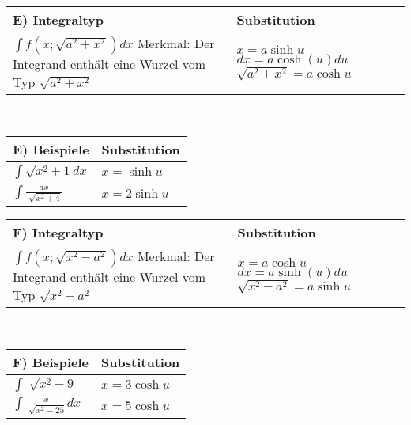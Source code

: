 \documentclass[../main.tex]{subfiles}
\begin{document}
\begin{tabularx}{0.9\textwidth} { 
    >{\centering\arraybackslash}X 
    >{\centering\arraybackslash}X  }
    \rowcolor{lightgray} E) Integraltyp & Substitution \\ [7pt]
    \hline
    $ \int f(x; \sqrt{a^2+x^2})dx$
    \newline \newline
    Merkmal: Der Integrand enthält eine Wurzel vom Typ $\sqrt{a^2+x^2}$
    &
    $x=a \sinh u$
    \newline 
    $ dx = a\cosh (u) du$
    \newline 
    $\sqrt{a^2+x^2} = a \cosh u$
    \\ [7pt]
\end{tabularx}
\\ [7pt]

\begin{tabularx}{0.9\textwidth} { 
    >{\centering\arraybackslash}X 
    >{\centering\arraybackslash}X  }
    \rowcolor{lightgray} E) Beispiele & Substitution \\ [7pt]
    \hline
    $ \int \sqrt{x^2+1}dx$ & $x=\sinh u$
    \\ [7pt]
    $ \int \frac{dx}{\sqrt[]{x^2+4}}$ & $x=2\sinh u$
    \\ [7pt]
\end{tabularx}

\begin{tabularx}{0.9\textwidth} { 
    >{\centering\arraybackslash}X 
    >{\centering\arraybackslash}X  }
    \rowcolor{lightgray} F) Integraltyp & Substitution \\ [7pt]
    \hline
    $ \int f(x; \sqrt{x^2-a^2})dx$
    \newline \newline
    Merkmal: Der Integrand enthält eine Wurzel vom Typ $\sqrt{x^2-a^2}$
    &
    $x=a \cosh u$
    \newline 
    $ dx = a\sinh (u) du$
    \newline 
    $\sqrt{x^2-a^2} = a \sinh u$
    \\ [7pt]
\end{tabularx}
\\ [7pt]

\begin{tabularx}{0.9\textwidth} { 
    >{\centering\arraybackslash}X 
    >{\centering\arraybackslash}X  }
    \rowcolor{lightgray} F) Beispiele & Substitution \\ [7pt]
    \hline
    $\int \sqrt[]{x^2-9}$ & $x=3\cosh u$
    \\ [7pt]
    $\int \frac{x}{\sqrt[]{x^2-25}}dx$ & $x=5\cosh u$
    \\ [7pt]
\end{tabularx}
\end{document}
